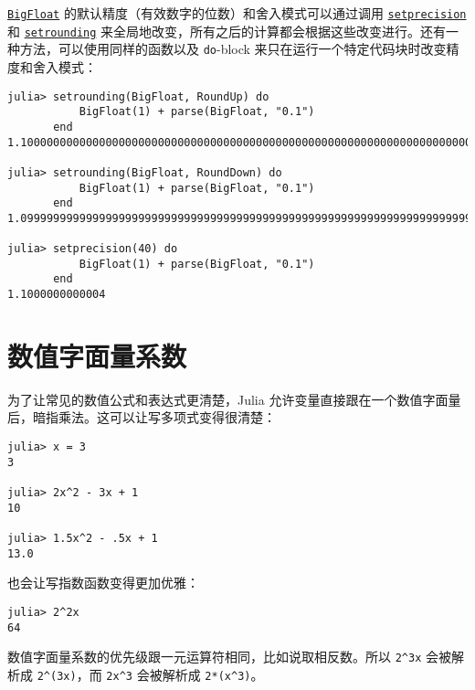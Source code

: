 \hyperlink{749816618809421837}{\texttt{BigFloat}} 的默认精度（有效数字的位数）和舍入模式可以通过调用 \hyperlink{3543074496498234209}{\texttt{setprecision}} 和 \hyperlink{16542701110177516527}{\texttt{setrounding}} 来全局地改变，所有之后的计算都会根据这些改变进行。还有一种方法，可以使用同样的函数以及 \texttt{do}-block 来只在运行一个特定代码块时改变精度和舍入模式：




\begin{verbatim}
julia> setrounding(BigFloat, RoundUp) do
           BigFloat(1) + parse(BigFloat, "0.1")
       end
1.100000000000000000000000000000000000000000000000000000000000000000000000000003

julia> setrounding(BigFloat, RoundDown) do
           BigFloat(1) + parse(BigFloat, "0.1")
       end
1.099999999999999999999999999999999999999999999999999999999999999999999999999986

julia> setprecision(40) do
           BigFloat(1) + parse(BigFloat, "0.1")
       end
1.1000000000004
\end{verbatim}



\hypertarget{14058350023597195643}{}


\section{数值字面量系数}



为了让常见的数值公式和表达式更清楚，Julia 允许变量直接跟在一个数值字面量后，暗指乘法。这可以让写多项式变得很清楚：




\begin{verbatim}
julia> x = 3
3

julia> 2x^2 - 3x + 1
10

julia> 1.5x^2 - .5x + 1
13.0
\end{verbatim}



也会让写指数函数变得更加优雅：




\begin{verbatim}
julia> 2^2x
64
\end{verbatim}



数值字面量系数的优先级跟一元运算符相同，比如说取相反数。所以 \texttt{2{\textasciicircum}3x} 会被解析成 \texttt{2{\textasciicircum}(3x)}，而 \texttt{2x{\textasciicircum}3} 会被解析成 \texttt{2*(x{\textasciicircum}3)}。



